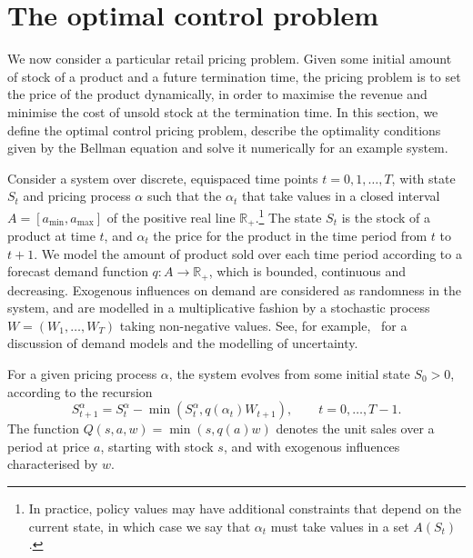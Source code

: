 \documentclass[main.tex]{subfiles}
\begin{document}
\listoftodos

\section{The optimal control problem}\label{sec:bellman_optimal_control}
We now consider a particular retail
pricing problem.
Given some initial amount of stock of a product and a future
termination time,
the pricing problem is to
set the price
of the product dynamically, in order to maximise the revenue and minimise the cost of
unsold stock at the termination time.
In this section, we define the optimal control pricing problem,
describe the optimality conditions given by the Bellman equation and
solve it numerically for an example system.

Consider a system over discrete, equispaced time points
$t=0,1,\dots,T$, with state
$S_t$ and pricing process $\alpha$ such that the $\alpha_t$ that take values in a closed
interval $A=[a_{\mathrm{min}},a_{\mathrm{max}}]$ of the positive real
line $\mathbb R_+$.\footnote{In
  practice, policy values may have additional constraints that depend
  on the current state,
  in which case we say that $\alpha_t$ must take values
  in a set $A(S_t)$.
}
The state $S_t$ is the stock of a product at time $t$, and
$\alpha_t$ the price for the product in the time period from $t$ to
$t+1$. We model the amount of product sold over each time period according
to a forecast demand
function $q:A\to\mathbb R_+$, which is bounded, continuous and decreasing.
Exogenous influences on demand are considered as randomness in the
system, and are
modelled in a multiplicative fashion by a stochastic process
$W=(W_1,\dots,W_T)$ taking non-negative values. See, for
example,~\cite[Ch.~7]{talluri2006theory} for a discussion of
demand models and the modelling of uncertainty.

For a given pricing process $\alpha$, the
system evolves from some initial state $S_0>0$, according to the
recursion
\begin{equation}\label{eq:stock_dynamics}
  S_{t+1}^\alpha=S_t^\alpha-\min(S_t^\alpha,q(\alpha_t)W_{t+1}),\qquad t=0,\dots,T-1.
\end{equation}
The function $Q(s,a,w)=\min(s,q(a)w)$ denotes the unit sales over a
period at price $a$,
starting with stock $s$, and with exogenous influences
characterised by $w$.
\end{document}
